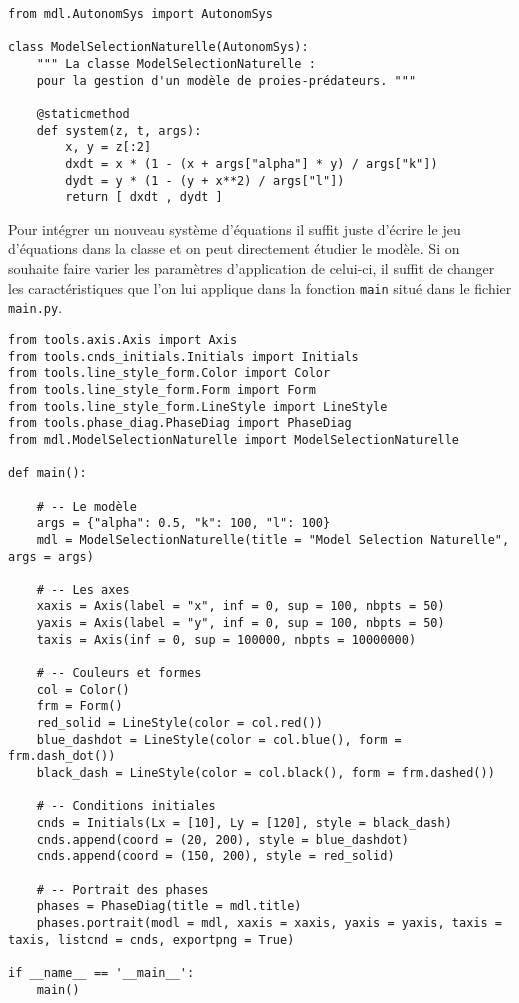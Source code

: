 \documentclass{article}
\begin{document}
\begin{verbatim}
from mdl.AutonomSys import AutonomSys

class ModelSelectionNaturelle(AutonomSys):
    """ La classe ModelSelectionNaturelle : 
    pour la gestion d'un modèle de proies-prédateurs. """

    @staticmethod
    def system(z, t, args):
        x, y = z[:2]
        dxdt = x * (1 - (x + args["alpha"] * y) / args["k"])
        dydt = y * (1 - (y + x**2) / args["l"])
        return [ dxdt , dydt ]
\end{verbatim}

\vspace{0.5cm}
Pour intégrer un nouveau système d'équations il suffit juste d'écrire le jeu d'équations dans la classe et on peut directement étudier le modèle.
Si on souhaite faire varier les paramètres d'application de celui-ci, il suffit de changer les caractéristiques que l'on lui applique dans la fonction \verb|main| situé dans le fichier \verb|main.py|.
\vspace{0.5cm}

\begin{verbatim}
from tools.axis.Axis import Axis
from tools.cnds_initials.Initials import Initials
from tools.line_style_form.Color import Color
from tools.line_style_form.Form import Form
from tools.line_style_form.LineStyle import LineStyle
from tools.phase_diag.PhaseDiag import PhaseDiag
from mdl.ModelSelectionNaturelle import ModelSelectionNaturelle

def main():

    # -- Le modèle
    args = {"alpha": 0.5, "k": 100, "l": 100}
    mdl = ModelSelectionNaturelle(title = "Model Selection Naturelle", args = args)

    # -- Les axes
    xaxis = Axis(label = "x", inf = 0, sup = 100, nbpts = 50)
    yaxis = Axis(label = "y", inf = 0, sup = 100, nbpts = 50)
    taxis = Axis(inf = 0, sup = 100000, nbpts = 10000000)

    # -- Couleurs et formes
    col = Color()
    frm = Form()
    red_solid = LineStyle(color = col.red())
    blue_dashdot = LineStyle(color = col.blue(), form = frm.dash_dot())
    black_dash = LineStyle(color = col.black(), form = frm.dashed())
    
    # -- Conditions initiales
    cnds = Initials(Lx = [10], Ly = [120], style = black_dash)
    cnds.append(coord = (20, 200), style = blue_dashdot)
    cnds.append(coord = (150, 200), style = red_solid)

    # -- Portrait des phases
    phases = PhaseDiag(title = mdl.title)
    phases.portrait(modl = mdl, xaxis = xaxis, yaxis = yaxis, taxis = taxis, listcnd = cnds, exportpng = True) 

if __name__ == '__main__':
    main()
\end{verbatim}
\end{document}
